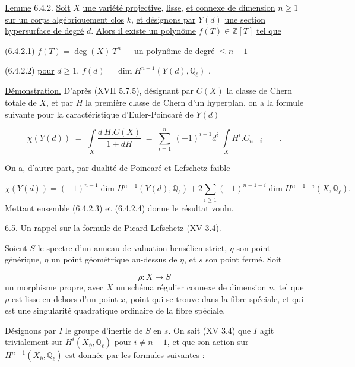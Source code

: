 \underline{Lemme} 6.4.2. \underline{Soit} $X$ \underline{une variété projective}, \underline{lisse}, \underline{et connexe de dimension} $n \geq 1$ \underline{sur un corps algébriquement clos} $k$, \underline{et désignons par} $Y(d)$ \underline{une section hypersurface de degré} $d$. \underline{Alors il existe un polynôme} $f(T) \in \mathbb{Z}[T]$ \underline{tel que}

(6.4.2.1)  $f(T) = \deg(X)\ T^n +$ \underline{un polynôme de degré} $\leq n-1$

(6.4.2.2)  \underline{pour} $d \geq 1$, $f(d) = \dim H^{n-1}(Y(d), \mathbb{Q}_\ell)$ \qquad .

\underline{Démonstration.}  D'après (XVII 5.7.5), désignant par $C(X)$ la classe de Chern totale de $X$, et par $H$ la première classe de Chern d'un hyperplan, on a la formule suivante pour la caractéristique d'Euler-Poincaré de $Y(d)$

\begin{equation}\tag{6.4.2.3}
\chi(Y(d)) \;=\; \int\limits_X \frac{d\ H.C(X)}{1 + dH} \;=\; \sum_{i=1}^{n} \ (-1)^{i-1} d^i \ \int\limits_X H^i . C_{n-i} \qquad .
\end{equation}


On a, d'autre part, par dualité de Poincaré et Lefschetz faible

\begin{equation}\tag{6.4.2.4}
\chi(Y(d)) = (-1)^{n-1}\dim H^{n-1}(Y(d),\mathbb{Q}_\ell) + 2 \sum_{i \geq 1} (-1)^{n-1-i}\dim H^{n-1-i}(X,\mathbb{Q}_\ell).
\end{equation}
Mettant ensemble (6.4.2.3) et (6.4.2.4) donne le résultat voulu.


6.5. \underline{Un rappel sur la formule de Picard-Lefschetz} (XV 3.4).

Soient $S$ le spectre d'un anneau de valuation hensélien strict, $\eta$ son point générique, $\overline{\eta}$ un point géométrique au-dessus de $\eta$, et $s$ son point fermé. Soit

\begin{equation*}
\rho : X \longrightarrow S
\end{equation*}
un morphisme propre, avec $X$ un schéma régulier connexe de dimension $n$, tel que $\rho$ est \underline{lisse} en dehors d'un point $x$, point qui se trouve dans la fibre spéciale, et qui est une singularité quadratique ordinaire de la fibre spéciale.

Désignons par $I$ le groupe d'inertie de $S$ en $s$. On sait (XV 3.4) que $I$ agit trivialement sur $H^i(X_{\overline{\eta}},\mathbb{Q}_\ell)$ pour $i \neq n-1$, et que son action sur $H^{n-1}(X_{\overline{\eta}},\mathbb{Q}_\ell)$ est donnée par les formules suivantes :


